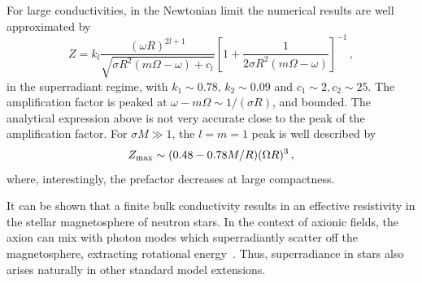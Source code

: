 \documentclass[11pt]{article}
\newcommand{\be}{\begin{equation}}
\newcommand{\ee}{\end{equation}}
\numberwithin{equation}{section} %
\begin{document}
For large conductivities, in the Newtonian limit the numerical results are well approximated by
%
\be
Z=k_l\frac{\left(\omega R\right)^{2l+1}}{\sqrt{\sigma R^2\left(m\Omega-\omega\right)+c_l}}\left[1+\frac{1}{2\sigma 
R^2\left(m\Omega -\omega\right)}\right]^{-1}\,,\label{large_sigma_Z}
\ee
%
in the superradiant regime, with $k_1\sim 0.78,\,k_2\sim0.09$ and $c_1\sim2, c_2\sim 25$. 
The amplification factor is peaked at $\omega-m\Omega \sim 1/(\sigma R)$, and bounded. The analytical expression above 
is not very accurate close to the peak of the amplification factor. For $\sigma M\gg1$, 
the $l=m=1$ peak is well described by
%
\be
Z_{\rm max} \sim (0.48-0.78 M/R) (\Omega R)^3\,,
\ee
%
where, interestingly, the prefactor decreases at large compactness.

It can be shown that a finite bulk conductivity results in an effective resistivity in the stellar magnetosphere of neutron stars. In the context of axionic fields, the axion can mix with photon modes which superradiantly scatter off the magnetosphere, extracting rotational energy~\cite{Day:2019bbh}. Thus, superradiance in stars also arises naturally in other standard model extensions.


\end{document}
